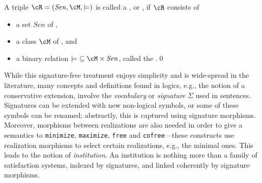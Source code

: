 \documentclass[10pt, a4paper]{isov2}
\newcommand*{\syntax}[1]{\texttt{#1}}
\begin{document}
\begin{definition}\label{def:room}
A triple $\cR=(\mathit{Sen},{\cM,\models)}$  is called a , or , if $\cR$ consists of
\begin{itemize}
\item a set $\mathit{Sen}$ of ,
\item a class
$\cM$ of , and
\item a binary relation
${\models} \subseteq \cM \times \mathit{Sen}$, called the .\quad\qed
\end{itemize}
\end{definition}


While this signature-free treatment enjoys simplicity and is wide-spread in the literature, many
concepts and definitions found in logics, e.g., the notion of a conservative extension, involve the
\emph{vocabulary} or \emph{signature} $\Sigma$ \label{vocabulary} used in sentences.  Signatures
can be extended with new non-logical symbols, or some of these symbols can be renamed; abstractly,
this is captured using signature morphisms. Moreover,  morphisms
between realizations are also needed in order to give a semantics to \syntax{minimize},
\syntax{maximize}, \syntax{free} and \syntax{cofree}---these constructs
use realization morphisms to select certain realizations, e.g., the minimal ones.
This leads to the notion of \emph{institution}. An institution
is nothing more than a family of satisfaction systems, indexed by
signatures, and linked coherently by signature morphisms.
\end{document}
